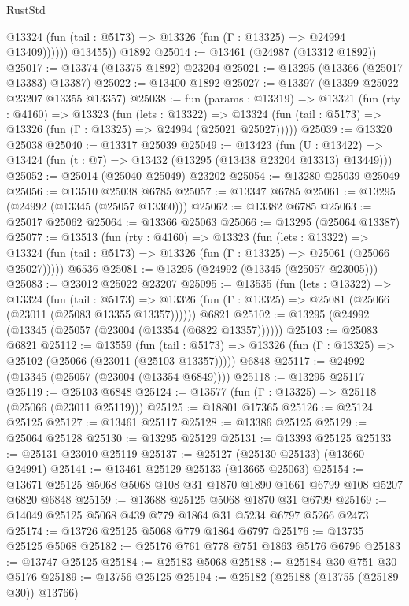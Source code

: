 \begin{lexlean}{RustStd}
\begin{coremodule}
              @13324 (fun (tail : @5173) => @13326 (fun (Γ : @13325) => @24994 @13409))))))
        @13455))
    @1892
@25014 := @13461 (@24987 (@13312 @1892))
@25017 := @13374 (@13375 @1892) @23204
@25021 := @13295 (@13366 (@25017 @13383) @13387)
@25022 := @13400 @1892
@25027 := @13397 (@13399 @25022 @23207 @13355 @13357)
@25038 := fun (params : @13319) =>
  @13321
    (fun (rty : @4160) =>
    @13323
      (fun (lets : @13322) =>
      @13324 (fun (tail : @5173) => @13326 (fun (Γ : @13325) => @24994 (@25021 @25027)))))
@25039 := @13320 @25038
@25040 := @13317 @25039
@25049 := @13423
    (fun (U : @13422) => @13424 (fun (t : @7) => @13432 (@13295 (@13438 @23204 @13313) @13449)))
@25052 := @25014 (@25040 @25049) @23202
@25054 := @13280 @25039 @25049
@25056 := @13510 @25038 @6785
@25057 := @13347 @6785
@25061 := @13295 (@24992 (@13345 (@25057 @13360)))
@25062 := @13382 @6785
@25063 := @25017 @25062
@25064 := @13366 @25063
@25066 := @13295 (@25064 @13387)
@25077 := @13513
    (fun (rty : @4160) =>
    @13323
      (fun (lets : @13322) =>
      @13324 (fun (tail : @5173) => @13326 (fun (Γ : @13325) => @25061 (@25066 @25027)))))
    @6536
@25081 := @13295 (@24992 (@13345 (@25057 @23005)))
@25083 := @23012 @25022 @23207
@25095 := @13535
    (fun (lets : @13322) =>
    @13324
      (fun (tail : @5173) =>
      @13326 (fun (Γ : @13325) => @25081 (@25066 (@23011 (@25083 @13355 @13357))))))
    @6821
@25102 := @13295 (@24992 (@13345 (@25057 (@23004 (@13354 (@6822 @13357))))))
@25103 := @25083 @6821
@25112 := @13559
    (fun (tail : @5173) => @13326 (fun (Γ : @13325) => @25102 (@25066 (@23011 (@25103 @13357)))))
    @6848
@25117 := @24992 (@13345 (@25057 (@23004 (@13354 @6849))))
@25118 := @13295 @25117
@25119 := @25103 @6848
@25124 := @13577 (fun (Γ : @13325) => @25118 (@25066 (@23011 @25119)))
@25125 := @18801 @17365
@25126 := @25124 @25125
@25127 := @13461 @25117
@25128 := @13386 @25125
@25129 := @25064 @25128
@25130 := @13295 @25129
@25131 := @13393 @25125
@25133 := @25131 @23010 @25119
@25137 := @25127 (@25130 @25133) (@13660 @24991)
@25141 := @13461 @25129 @25133 (@13665 @25063)
@25154 := @13671 @25125 @5068 @5068 @108 @31 @1870 @1890 @1661 @6799 @108 @5207 @6820 @6848
@25159 := @13688 @25125 @5068 @1870 @31 @6799
@25169 := @14049 @25125 @5068 @439 @779 @1864 @31 @5234 @6797 @5266 @2473
@25174 := @13726 @25125 @5068 @779 @1864 @6797
@25176 := @13735 @25125 @5068
@25182 := @25176 @761 @778 @751 @1863 @5176 @6796
@25183 := @13747 @25125
@25184 := @25183 @5068
@25188 := @25184 @30 @751 @30 @5176
@25189 := @13756 @25125
@25194 := @25182 (@25188 (@13755 (@25189 @30)) @13766)

\end{coremodule}
\end{lexlean}
